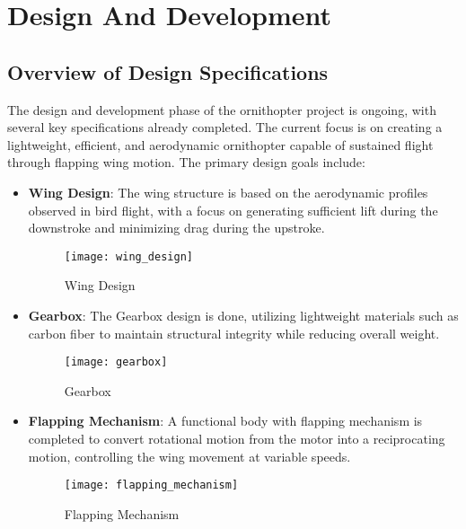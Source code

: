\chapter{Design And Development}

\section{Overview of Design Specifications}
The design and development phase of the ornithopter project is ongoing, with several key specifications already completed. The current focus is on creating a lightweight, efficient, and aerodynamic ornithopter capable of sustained flight through flapping wing motion. The primary design goals include:

\begin{itemize}
    \item \textbf{Wing Design}: The wing structure is based on the aerodynamic profiles observed in bird flight, with a focus on generating sufficient lift during the downstroke and minimizing drag during the upstroke.
    
    \begin{figure}[H]
        \centering
        \texttt{[image: wing\_design]}
        \caption{Wing Design}
        \label{fig:wing_design}
    \end{figure}
    
    \item \textbf{Gearbox}: The Gearbox design is done, utilizing lightweight materials such as carbon fiber to maintain structural integrity while reducing overall weight.
    
    \begin{figure}[H]
        \centering
        \texttt{[image: gearbox]}
        \caption{Gearbox}
        \label{fig:gearbox}
    \end{figure}
    
    \item \textbf{Flapping Mechanism}: A functional body with flapping mechanism is completed to convert rotational motion from the motor into a reciprocating motion, controlling the wing movement at variable speeds.
    
    \begin{figure}[H]
        \centering
        \texttt{[image: flapping\_mechanism]}
        \caption{Flapping Mechanism}
        \label{fig:flapping_mechanism}
    \end{figure}
\end{itemize}

